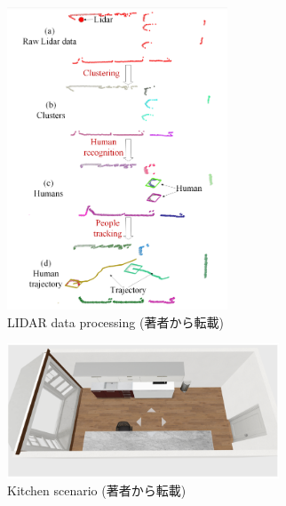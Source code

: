 \begin{figure}[t]
  \begin{center}
  \includegraphics[height=90mm,clip]{figure/2-2_LIDAR-data-processing.png}
  \caption{LIDAR data processing (著者\cite{Temporal convolutional networks for multi-person activity recognition using a 2D LIDAR}から転載)}
  \label{2-2_LIDAR data processing}
  \end{center}
\end{figure}

\begin{figure}[t]
  \begin{center}
  \includegraphics[height=40mm,clip]{figure/2-2_Kitchen-scenario.png}
  \caption{Kitchen scenario (著者\cite{Temporal convolutional networks for multi-person activity recognition using a 2D LIDAR}から転載)}
  \label{2-2_Kitchen scenario}
  \end{center}
\end{figure}

